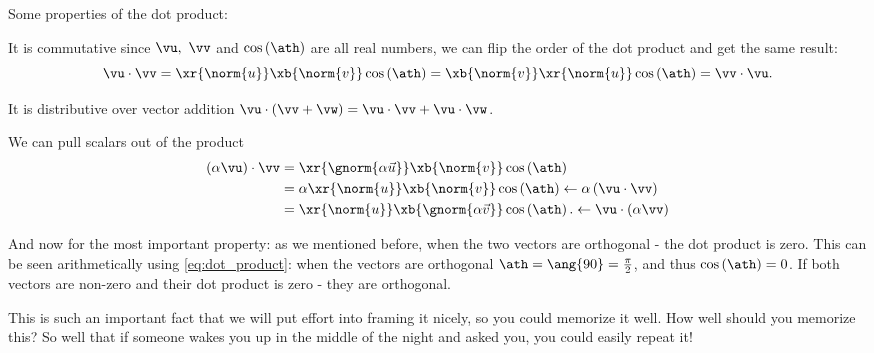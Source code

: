Some properties of the dot product:
\begin{descitemize}
  \item[It is commutative] since $\vu,\ \vv$ and $\cos\left(\ath\right)$ are all real numbers, we can flip the order of the dot product and get the same result:
    \[
      \vu \cdot \vv = \xr{\norm{u}}\xb{\norm{v}}\cos\left(\ath\right) = \xb{\norm{v}}\xr{\norm{u}}\cos\left(\ath\right) = \vv \cdot \vu.
    \]

  \item[It is distributive over vector addition] $\vu\cdot\left(\vv+\vw\right)=\vu\cdot\vv + \vu\cdot\vw$.

  \item[We can pull scalars out of the product]
    \begin{align*}
      \left( \alpha \vu \right)\cdot\vv &= \xr{\gnorm{\alpha\vec{u}}}\xb{\norm{v}}\cos\left(\ath\right)\\
                                        &= \alpha\xr{\norm{u}}\xb{\norm{v}}\cos\left(\ath\right) \leftarrow \alpha\left(\vu\cdot\vv\right) \\
                                        &= \xr{\norm{u}}\xb{\gnorm{\alpha\vec{v}}}\cos\left(\ath\right). \leftarrow \vu\cdot\left(\alpha\vv\right) \\
    \end{align*}
\end{descitemize}

And now for the most important property: as we mentioned before, when the two vectors are orthogonal - the dot product is zero. This can be seen arithmetically using \autoref{eq:dot_product}: when the vectors are orthogonal $\ath=\ang{90}=\frac{\pi}{2}$, and thus $\cos\left(\ath\right)=0$. If both vectors are non-zero and their dot product is zero - they are orthogonal.

This is such an important fact that we will put effort into framing it nicely, so you could memorize it well. How well should you memorize this? So well that if someone wakes you up in the middle of the night and asked you, you could easily repeat it!

